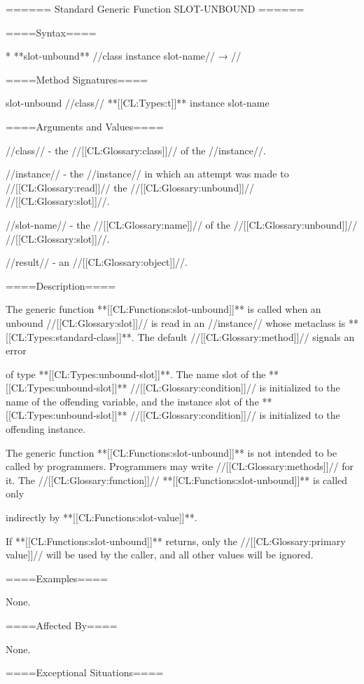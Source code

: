 ====== Standard Generic Function SLOT-UNBOUND ======

====Syntax====

  * **slot-unbound** //class instance slot-name// → //

====Method Signatures====

\Defmeth slot-unbound {//class// **[[CL:Types:t]]** instance slot-name}

====Arguments and Values====

//class// - the //[[CL:Glossary:class]]// of the //instance//.

//instance// - the //instance// in which an attempt was made to //[[CL:Glossary:read]]// the //[[CL:Glossary:unbound]]// //[[CL:Glossary:slot]]//.

//slot-name// - the //[[CL:Glossary:name]]// of the //[[CL:Glossary:unbound]]// //[[CL:Glossary:slot]]//.

//result// - an //[[CL:Glossary:object]]//.

====Description====

The generic function **[[CL:Functions:slot-unbound]]** is called when an unbound //[[CL:Glossary:slot]]// is read in an //instance// whose metaclass is **[[CL:Types:standard-class]]**. The default //[[CL:Glossary:method]]// signals an error

of type **[[CL:Types:unbound-slot]]**. The name slot of the **[[CL:Types:unbound-slot]]** //[[CL:Glossary:condition]]// is initialized to the name of the offending variable, and the instance slot of the **[[CL:Types:unbound-slot]]** //[[CL:Glossary:condition]]// is initialized to the offending instance.



The generic function **[[CL:Functions:slot-unbound]]** is not intended to be called by programmers. Programmers may write //[[CL:Glossary:methods]]// for it. The //[[CL:Glossary:function]]// **[[CL:Functions:slot-unbound]]** is called only

indirectly by **[[CL:Functions:slot-value]]**.


If **[[CL:Functions:slot-unbound]]** returns, only the //[[CL:Glossary:primary value]]// will be used by the caller, and all other values will be ignored.

====Examples====

None.

====Affected By====

None.

====Exceptional Situations====

